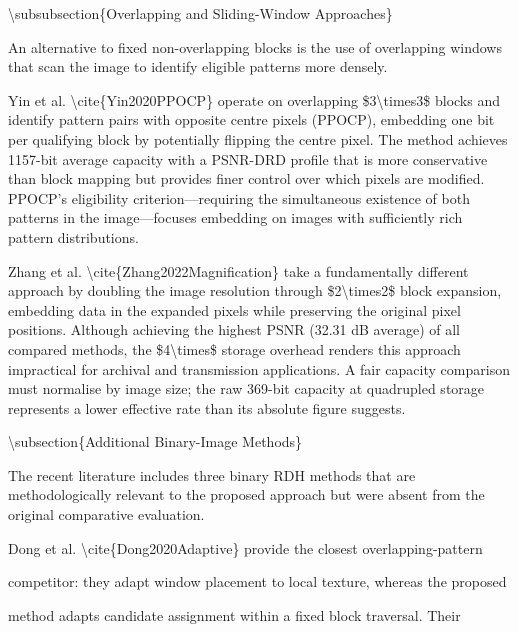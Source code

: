 \documentclass[a4paper,fleqn]{cas-dc}
\newenvironment{RevisionDeletion}{%
  \par\begingroup\color{revisionred}\footnotesize\ttfamily
  \setlength{\parindent}{0pt}\setlength{\parskip}{1pt}\obeyspaces
}{\par\endgroup}
\begin{document}
\begin{RevisionDeletion}
\par
\textbackslash{}subsubsection\{Overlapping and Sliding-Window Approaches\}\par
\par
An alternative to fixed non-overlapping blocks is the use of overlapping windows that scan the image to identify eligible patterns more densely.\par
\par
Yin et al. \textbackslash{}cite\{Yin2020PPOCP\} operate on overlapping \$3\textbackslash{}times3\$ blocks and identify pattern pairs with opposite centre pixels (PPOCP), embedding one bit per qualifying block by potentially flipping the centre pixel. The method achieves 1157-bit average capacity with a PSNR-DRD profile that is more conservative than block mapping but provides finer control over which pixels are modified. PPOCP's eligibility criterion---requiring the simultaneous existence of both patterns in the image---focuses embedding on images with sufficiently rich pattern distributions.\par
\par
Zhang et al. \textbackslash{}cite\{Zhang2022Magnification\} take a fundamentally different approach by doubling the image resolution through \$2\textbackslash{}times2\$ block expansion, embedding data in the expanded pixels while preserving the original pixel positions. Although achieving the highest PSNR (32.31 dB average) of all compared methods, the \$4\textbackslash{}times\$ storage overhead renders this approach impractical for archival and transmission applications. A fair capacity comparison must normalise by image size; the raw 369-bit capacity at quadrupled storage represents a lower effective rate than its absolute figure suggests.\par
\par
\textbackslash{}subsection\{Additional Binary-Image Methods\}\par
\par
The recent literature includes three binary RDH methods that are methodologically relevant to the proposed approach but were absent from the original comparative evaluation.\par
\par
Dong et al. \textbackslash{}cite\{Dong2020Adaptive\} provide the closest overlapping-pattern\par
competitor: they adapt window placement to local texture, whereas the proposed\par
method adapts candidate assignment within a fixed block traversal. Their\par

\end{RevisionDeletion}
\end{document}
